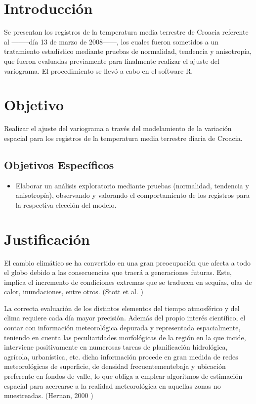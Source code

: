 \section{Introducción}

Se presentan los registros de la temperatura media terrestre de Croacia referente al --------día 13 de marzo de 2008------, los cuales fueron sometidos a un tratamiento estadístico mediante pruebas de
normalidad, tendencia y anisotropía, que fueron evaluadas previamente para finalmente realizar el
ajuste del variograma. El procedimiento se llevó a cabo en el software R.


\section{Objetivo}

Realizar el ajuste del variograma a través del modelamiento de la variación espacial para los registros de la temperatura media terrestre diaria de Croacia.

\subsection{Objetivos Específicos}

\begin{itemize}
    \item Elaborar un análisis exploratorio mediante pruebas (normalidad, tendencia y anisotropía),
observando y valorando el comportamiento de los registros para la respectiva elección del
modelo.

\end{itemize}

\section{Justificación}

El cambio climático se ha convertido en una gran preocupación que afecta a todo el globo debido a las consecuencias que traerá a generaciones futuras. Este, implica el incremento de condiciones extremas
que se traducen en sequías, olas de calor, inundaciones, entre otros.  (Stott et al. \cite{stott_ea})

La  correcta  evaluación  de  los  distintos  elementos  del  tiempo  atmosférico  y  del  clima  requiere cada día mayor precisión. Además del propio interés científico, el contar con información meteorológica depurada y representada espacialmente, teniendo en cuenta las peculiaridades morfológicas de la región en la que incide, interviene positivamente en numerosas tareas de planificación hidrológica, agrícola, urbanística, etc. dicha  información  procede  en  gran  medida  de  redes  meteorológicas  de  superficie,  de  densidad  frecuentementebaja  y  ubicación  preferente  en  fondos  de  valle,  lo  que  obliga  a  emplear  algoritmos  de  estimación  espacial  para acercarse a la realidad meteorológica en aquellas zonas no muestreadas. (Hernan, 2000 \cite{hernan_ea})

